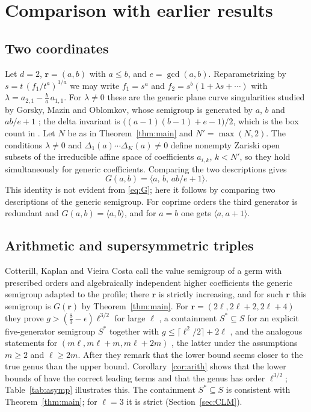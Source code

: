 \documentclass{amsart}
\theoremstyle{definition}
\numberwithin{equation}{section}
\newcommand{\bfr}{\mathbf{r}}
\newcommand{\gen}[1]{\langle #1\rangle}
\begin{document}
\section{Comparison with earlier results}\label{sec:compare}

\subsection{Two coordinates}\label{sec:plane}
Let $d=2$, $\bfr=(a,b)$ with $a\le b$, and $e=\gcd(a,b)$. Reparametrizing by
$s=t\,(f_1/t^a)^{1/a}$ we may write $f_1=s^a$ and
$f_2=s^b(1+\lambda s+\cdots)$ with $\lambda=a_{2,1}-\frac ba\,a_{1,1}$. For
$\lambda\ne0$ these are the generic plane curve singularities studied by
Gorsky, Mazin and Oblomkov, whose semigroup is generated by $a$, $b$ and
$ab/e+1$ \cite[Section~1 and Section~1.1]{GMO}; the delta invariant is
\mbox{$\bigl((a-1)(b-1)+e-1\bigr)/2$}, which is the box count in
\cite[Theorem~1.1(b)]{GMO}. Let $N$ be as in Theorem~\ref{thm:main} and
$N'=\max(N,2)$. The conditions $\lambda\ne0$ and
$\Delta_1(a)\cdots\Delta_K(a)\ne0$ define nonempty Zariski open subsets of the
irreducible affine space of coefficients $a_{i,k}$, $k<N'$, so they hold
simultaneously for generic coefficients. Comparing the two descriptions gives
\[
  G(a,b)=\gen{a,\,b,\,ab/e+1}.
\]
This identity is not evident from \eqref{eq:G}; here it follows by comparing
two descriptions of the generic semigroup. For coprime orders the third
generator is redundant and $G(a,b)=\gen{a,b}$, and for $a=b$ one gets
$\gen{a,a+1}$.

\subsection{Arithmetic and supersymmetric triples}\label{sec:CKV}
Cotterill, Kaplan and Vieira Costa \cite{CKV} call the value semigroup of a
germ with prescribed orders and algebraically independent higher coefficients
the generic semigroup adapted to the profile; there $\bfr$ is strictly
increasing, and for such $\bfr$ this semigroup is $G(\bfr)$ by
Theorem~\ref{thm:main}. For $\bfr=(2\ell,2\ell+2,2\ell+4)$ they prove
$g>(\frac83-\epsilon)\ell^{3/2}$ for large $\ell$ \cite[Corollary~2.5]{CKV}, a
containment $S^*\subseteq S$ for an explicit five-generator semigroup $S^*$
together with $g\le\lceil\ell^2/2\rceil+2\ell$ \cite[Theorem~2.9]{CKV}, and the
analogous statements for $(m\ell,m\ell+m,m\ell+2m)$
\cite[Corollary~2.7, Theorem~2.10]{CKV}, the latter under the assumptions
$m\ge2$ and $\ell\ge2m$. After \cite[Theorem~2.9]{CKV} they
remark that the lower bound seems closer to the true genus than the upper
bound. Corollary~\ref{cor:arith} shows that the lower bounds of
\cite[Corollaries~2.5 and~2.7]{CKV} have the correct leading terms and that
the genus has order $\ell^{3/2}$; Table~\ref{tab:asymp} illustrates this. The
containment $S^*\subseteq S$ is consistent with Theorem~\ref{thm:main}; for
$\ell=3$ it is strict (Section~\ref{sec:CLM}).
\end{document}

